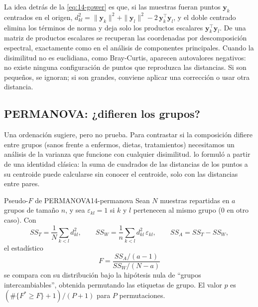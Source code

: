 \begin{simbolos}
\end{simbolos}

La idea detrás de la \cref{eq:14-gower} es que, si las muestras fueran puntos $\mathbf{y}_k$ centrados en el origen, $d_{kl}^2 = \|\mathbf{y}_k\|^2 + \|\mathbf{y}_l\|^2 - 2\,\mathbf{y}_k^{\top}\mathbf{y}_l$, y el doble centrado elimina los términos de norma y deja solo los productos escalares $\mathbf{y}_k^{\top}\mathbf{y}_l$. De una matriz de productos escalares se recuperan las coordenadas por descomposición espectral, exactamente como en el análisis de componentes principales. Cuando la disimilitud no es euclidiana, como Bray-Curtis, aparecen autovalores negativos: no existe ninguna configuración de puntos que reproduzca las distancias. Si son pequeños, se ignoran; si son grandes, conviene aplicar una corrección o usar otra distancia.

\subsection{PERMANOVA: ¿difieren los grupos?}

Una ordenación sugiere, pero no prueba. Para contrastar si la composición difiere entre grupos (sanos frente a enfermos, dietas, tratamientos) necesitamos un análisis de la varianza que funcione con cualquier disimilitud. \textcite{c14-anderson2001} lo formuló a partir de una identidad clásica: la suma de cuadrados de las distancias de los puntos a su centroide puede calcularse sin conocer el centroide, solo con las distancias entre pares.

\begin{teorema}{Pseudo-$F$ de PERMANOVA}{14-permanova}
Sean $N$ muestras repartidas en $a$ grupos de tamaño $n$, y sea $\varepsilon_{kl}=1$ si $k$ y $l$ pertenecen al mismo grupo (0 en otro caso). Con
\begin{equation}\label{eq:14-ss}
SS_T = \frac{1}{N}\sum_{k<l} d_{kl}^2, \qquad SS_W = \frac{1}{n}\sum_{k<l} d_{kl}^2\,\varepsilon_{kl}, \qquad SS_A = SS_T - SS_W,
\end{equation}
el estadístico
\begin{equation}\label{eq:14-pseudoF}
F = \frac{SS_A/(a-1)}{SS_W/(N-a)}
\end{equation}
se compara con su distribución bajo la hipótesis nula de ``grupos intercambiables'', obtenida permutando las etiquetas de grupo. El valor $p$ es $(\#\{F^{*} \ge F\} + 1)/(P+1)$ para $P$ permutaciones.
\end{teorema}

